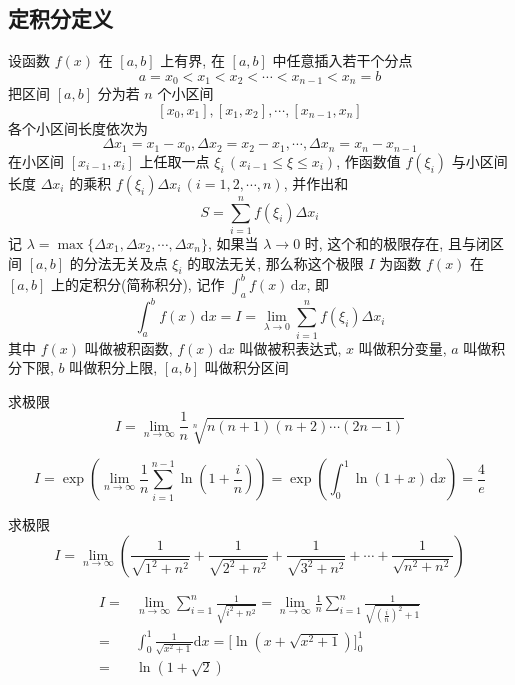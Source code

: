 \documentclass[color=green,titlestyle=hang]{elegantbook}%
\begin{document}
\subsection{定积分定义}

\begin{newdef}[定积分]
设函数 $f(x)$ 在 $[a,b]$ 上有界, 在 $[a,b]$ 中任意插入若干个分点\[a=x_0<x_1<x_2<\cdots<x_{n-1}<x_n=b\]
把区间 $[a,b]$ 分为若 $n$ 个小区间 \[[x_0,x_1],[x_1,x_2],\cdots,[x_{n-1},x_n]\]
各个小区间长度依次为\[\Delta x_1=x_1-x_0,\Delta x_2=x_2-x_1,\cdots,\Delta x_n=x_n-x_{n-1}\]
在小区间 $[x_{i-1},x_i]$ 上任取一点 $\xi_i$\,$(x_{i-1}\leqslant\xi\leqslant x_{i})$,  作函数值 $f(\xi_i)$ 与小区间长度 $\Delta x_i$ 的乘积 $f(\xi_i)\Delta x_i\,(i=1,2,\cdots,n)$, 并作出和
\[S=\sum_{i=1}^{n}f(\xi_i)\Delta x_i\]
记 $\lambda=\max\{\Delta x_1,\Delta x_2,\cdots,\Delta x_n\}$, 如果当 $\lambda\to0$ 时, 这个和的极限存在, 且与闭区间 $[a,b]$ 的分法无关及点 $\xi_i$ 的取法无关, 那么称这个极限 $I$ 为函数 $f(x)$ 在 $[a,b]$ 上的定积分(简称积分), 记作 $\int_a^bf(x)\,\mathrm{d}x$, 即\[\int_a^bf(x)\,\mathrm{d}x=I=\lim_{\lambda\to0}\sum_{i=1}^{n}f(\xi_i)\Delta x_i\]
其中 $f(x)$ 叫做被积函数, $f(x)\,\mathrm{d}x$ 叫做被积表达式, $x$ 叫做积分变量, $a$ 叫做积分下限, $b$ 叫做积分上限, $[a,b]$ 叫做积分区间	
\end{newdef}

\begin{exercise}求极限\begin{equation*}I=\lim_{n\to\infty}\frac{1}{n}\sqrt[n]{n(n+1)(n+2)\cdots(2n-1)}\end{equation*}
\end{exercise}\begin{Solution}
\[I=\exp\left(\lim_{n\to\infty}\frac{1}{n}\sum_{i=1}^{n-1}\ln\left(1+\frac{i}{n}\right)\right)=
\exp\left(\int_0^1\ln(1+x)\,\mathrm{d}x\right)=\frac{4}{e}\]	
\end{Solution}

\begin{exercise}求极限\begin{equation*}I=\lim_{n\to\infty}\left(\frac{1}{\sqrt{1^2+n^2}}+\frac{1}{\sqrt{2^2+n^2}}+\frac{1}{\sqrt{3^2+n^2}}+\cdots+\frac{1}{\sqrt{n^2+n^2}}\right)\end{equation*}
\end{exercise}\begin{Solution}
\begin{align*}I
=&\lim_{n\to\infty}\sum_{i=1}^{n}\frac{1}{\sqrt{i^2+n^2}}=\lim_{n\to\infty}\frac{1}{n}\sum_{i=1}^{n}\frac{1}{\sqrt{(\frac{i}{n})^2+1}}\\
=&\int_{0}^{1}\frac{1}{\sqrt{x^2+1}}\mathrm{d}x=\Big[\ln(x+\sqrt{x^2+1})\Big]_{0}^{1}\\
=&\ln(1+\sqrt{2})	
\end{align*}
\end{Solution}
\end{document}
